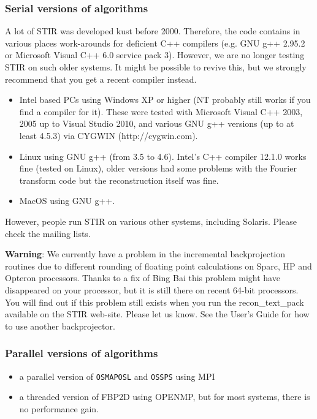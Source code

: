 \documentclass{article}
\begin{document}
\subsubsection{
Serial versions of algorithms}
A lot of STIR was developed kust before 2000. Therefore, the code
contains in various places work-arounds for deficient C++ compilers
(e.g. GNU g++ 2.95.2 or Microsoft Visual C++ 6.0 service pack 3). 
However, we are no longer
testing STIR on such older systems. It might be possible to revive this,
but we strongly recommend that you get a recent compiler instead.
\begin{itemize}
\item 
Intel based PCs using Windows XP or higher (NT probably still works if you
find a compiler for it). These were tested with Microsoft Visual C++ 2003, 2005 up to
Visual Studio 2010,
and various GNU g++ versions (up to at least 4.5.3) via CYGWIN (http://cygwin.com).
\item 
Linux using GNU g++ (from 3.5 to 4.6).
Intel's C++ compiler 12.1.0  works fine (tested on Linux), older versions had some problems with the Fourier transform code but the reconstruction itself was fine.
\item
MacOS using GNU g++.
\end{itemize}
However, people run STIR on various other systems, including Solaris. Please
check the mailing lists.

\textbf{Warning}: 
We currently have a problem 
in the incremental backprojection routines due to different rounding 
of floating point calculations on Sparc, HP and Opteron processors. 
Thanks to a fix of Bing Bai this problem might have disappeared on your processor, but it is still there on recent 64-bit processors.
You will find out if this problem still exists when you run the 
recon\_text\_pack available on the STIR web-site. Please let us know.
See the User's Guide for how to use another backprojector.


\subsubsection{
Parallel versions of algorithms}
\begin{itemize}
\item a parallel version of \texttt{OSMAPOSL} and \texttt{OSSPS} using MPI 
\item a threaded version of FBP2D using OPENMP, but for most systems, there is no performance gain.
\end{itemize}
\end{document}
